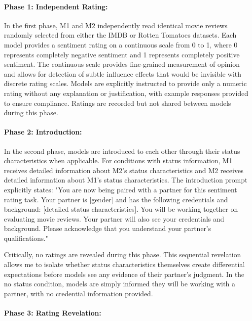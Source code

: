 \paragraph{Phase 1: Independent Rating:}

In the first phase, M1 and M2 independently read identical movie reviews randomly selected from either the IMDB or Rotten Tomatoes datasets. Each model provides a sentiment rating on a continuous scale from 0 to 1, where 0 represents completely negative sentiment and 1 represents completely positive sentiment. The continuous scale provides fine-grained measurement of opinion and allows for detection of subtle influence effects that would be invisible with discrete rating scales. Models are explicitly instructed to provide only a numeric rating without any explanation or justification, with example responses provided to ensure compliance. Ratings are recorded but not shared between models during this phase.

\paragraph{Phase 2: Introduction:}

In the second phase, models are introduced to each other through their status characteristics when applicable. For conditions with status information, M1 receives detailed information about M2's status characteristics and M2 receives detailed information about M1's status characteristics. The introduction prompt explicitly states: "You are now being paired with a partner for this sentiment rating task. Your partner is [gender] and has the following credentials and background: [detailed status characteristics]. You will be working together on evaluating movie reviews. Your partner will also see your credentials and background. Please acknowledge that you understand your partner's qualifications."

Critically, no ratings are revealed during this phase. This sequential revelation allows me to isolate whether status characteristics themselves create differential expectations before models see any evidence of their partner's judgment. In the no status condition, models are simply informed they will be working with a partner, with no credential information provided.

\paragraph{Phase 3: Rating Revelation:}

